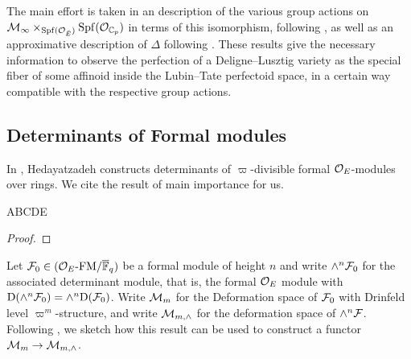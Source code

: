 \documentclass[../main.tex]{subfiles}
\begin{document}
The main effort is taken in an description of the various group actions on
$\mathcal{M}_\infty \times_{\operatorname{Spf}(\mathcal{O}_{\breve {E}})} \operatorname{Spf}(\mathcal{O}_{\mathbb{C}_p})$ in terms of this
isomorphism, following \cite[Section 1.2]{imaitsushima2020affinoids}, 
as well as an approximative description of $\Delta$ following \cite[Section
2.10]{BoyarchenkoWeinstein2011MaxVar}.
These results give the necessary information to observe the perfection of a
Deligne--Lusztig variety as the special fiber of some affinoid inside the
Lubin--Tate perfectoid space, in a certain way compatible with the respective group
actions. 




\subsection{Determinants of Formal modules} %
\label{sub:Determinants of Formal modules}
In \cite{hedayatzadeh2015det}, Hedayatzadeh constructs determinants of 
$\varpi$-divisible formal $\mathcal{O}_E$-modules over  rings. 
We cite the result of main importance for us.
\begin{thm}\label{thm:HedayatzadehsResult}
  ABCDE
\begin{proof}
\end{proof}
\end{thm}

Let $\mathcal{F}_0 \in {({\mathcal{O}_E}\text-\allowbreak\mathrm{FM}/{{\overline{\mathbb{F}}_q}})}$ be a formal module of height $n$ and 
write $\wedge^n\mathcal{F}_0$ for the associated determinant module, that is, the 
formal $\mathcal{O}_E$ module with $\mathrm{D}(\wedge^n\mathcal{F}_0) = \wedge^n\mathrm{D}(\mathcal{F}_0)$. Write
$\mathcal{M}_m$ for the Deformation space of $\mathcal{F}_0$ with Drinfeld level
$\varpi^m$-structure, and write $\mathcal{M}_{m, \wedge}$ for the deformation space of
$\wedge^n\mathcal{F}$. 
Following \cite{weinstein2016semistable}, we sketch how this result can be
used to construct a functor $\mathcal{M}_{m} \to \mathcal{M}_{m, \wedge}$. 
\end{document}
